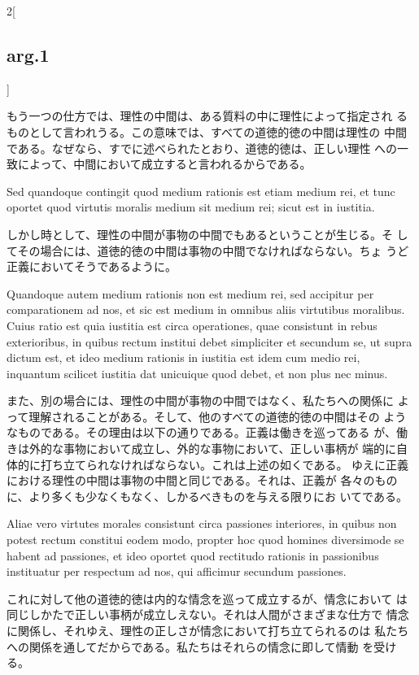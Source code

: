 \documentclass[paper=a4paper,fontsize=10pt,jafontsize=9pt,titlepage]{jlreq}
\begin{document}
\begin{paracol}{2}[\subsection{arg.1}]
\switchcolumn

もう一つの仕方では、理性の中間は、ある質料の中に理性によって指定され
 るものとして言われうる。この意味では、すべての道徳的徳の中間は理性の
 中間である。なぜなら、すでに述べられたとおり、道徳的徳は、正しい理性
 への一致によって、中間において成立すると言われるからである。

\switchcolumn*

Sed quandoque contingit quod medium rationis est etiam medium rei, et
 tunc oportet quod virtutis moralis medium sit medium rei; sicut est
 in iustitia.

\switchcolumn

しかし時として、理性の中間が事物の中間でもあるということが生じる。そ
 してその場合には、道徳的徳の中間は事物の中間でなければならない。ちょ
 うど正義においてそうであるように。

\switchcolumn*

Quandoque autem medium rationis non est medium rei, sed accipitur per
 comparationem ad nos, et sic est medium in omnibus aliis virtutibus
 moralibus. Cuius ratio est quia iustitia est circa operationes, quae
 consistunt in rebus exterioribus, in quibus rectum institui debet
 simpliciter et secundum se, ut supra dictum est, et ideo medium
 rationis in iustitia est idem cum medio rei, inquantum scilicet
 iustitia dat unicuique quod debet, et non plus nec minus.

\switchcolumn

また、別の場合には、理性の中間が事物の中間ではなく、私たちへの関係に
 よって理解されることがある。そして、他のすべての道徳的徳の中間はその
 ようなものである。その理由は以下の通りである。正義は働きを巡ってある
 が、働きは外的な事物において成立し、外的な事物において、正しい事柄が
 端的に自体的に打ち立てられなければならない。これは上述の如くである。
 ゆえに正義における理性の中間は事物の中間と同じである。それは、正義が
 各々のものに、より多くも少なくもなく、しかるべきものを与える限りにお
 いてである。

\switchcolumn*

Aliae vero virtutes morales consistunt circa passiones interiores, in
 quibus non potest rectum constitui eodem modo, propter hoc quod
 homines diversimode se habent ad passiones, et ideo oportet quod
 rectitudo rationis in passionibus instituatur per respectum ad nos,
 qui afficimur secundum passiones.

\switchcolumn

これに対して他の道徳的徳は内的な情念を巡って成立するが、情念において
 は同じしかたで正しい事柄が成立しえない。それは人間がさまざまな仕方で
 情念に関係し、それゆえ、理性の正しさが情念において打ち立てられるのは
 私たちへの関係を通してだからである。私たちはそれらの情念に即して情動
 を受ける。


\end{paracol}
\end{document}
